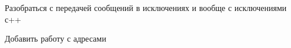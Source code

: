 
\begin{DoxyRefList}
\item[\label{todo__todo000001}%
\hypertarget{todo__todo000001}{}%
Файл \hyperlink{_exceptions_8h}{Exceptions.h} ]Разобраться с передачей сообщений в исключениях и вообще с исключениями с++  
\item[\label{todo__todo000002}%
\hypertarget{todo__todo000002}{}%
Класс \hyperlink{classkpk_1_1core_1_1_person_service}{kpk\+:\+:core\+:\+:Person\+Service} ]Добавить работу с адресами 
\end{DoxyRefList}